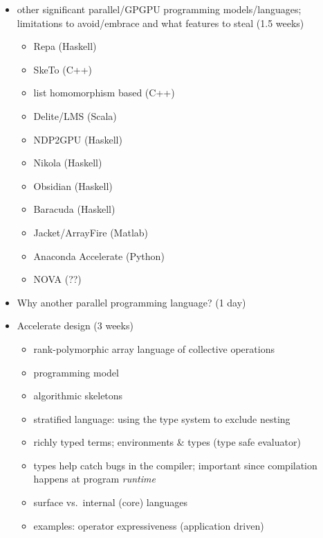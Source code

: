 \begin{itemize}
\item other significant parallel/GPGPU programming models/languages; limitations
    to avoid/embrace and what features to steal (1.5 weeks)
    \begin{itemize}
        \item Repa \cite{Keller:2010er,Lippmeier:2011cd,Lippmeier:2012gx} (Haskell)
        \item SkeTo \cite{Matsuzaki:2011ew} (C++)
        \item list homomorphism based \cite{Sato:2009cq} (C++)
        \item Delite/LMS \cite{Rompf:2013er} (Scala)
        \item NDP2GPU \cite{Bergstrom:2012bi} (Haskell)
        \item Nikola \cite{Mainland:2010vj} (Haskell)
        \item Obsidian \cite{Svensson:2008a,Claessen:2012hl} (Haskell)
        \item Baracuda \cite{Larsen:2011fa} (Haskell)
        \item Jacket/ArrayFire \cite{AccelerEyes:vq} (Matlab)
        \item Anaconda Accelerate \cite{AnacondaAccelerate:2013vn} (Python)
        \item NOVA \cite{Collins:2013wn} (??)
    \end{itemize}

    \item Why another parallel programming language? (1 day)

    \item Accelerate design (3 weeks)
        \begin{itemize}
            \item rank-polymorphic array language of collective operations
            \item programming model
            \item algorithmic skeletons
            \item stratified language: using the type system to exclude nesting
            \item richly typed terms; environments \& types (type safe evaluator)
            \item types help catch bugs in the compiler; important since
                compilation happens at program \emph{runtime}
            \item surface vs.\ internal (core) languages
            \item examples: operator expressiveness (application driven)
        \end{itemize}

\end{itemize}


